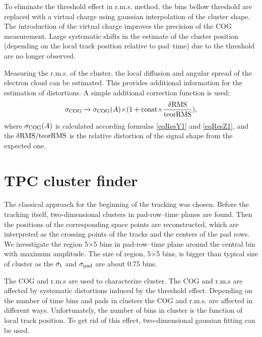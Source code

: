 \documentclass[a4paper,12pt]{article}
\begin{document}
To eliminate the threshold effect in r.m.s. method, the bins
bellow threshold are replaced with a virtual charge  using
gaussian interpolation of the cluster shape. The introduction of
the virtual charge improves the precision of the COG measurement.
Large systematic shifts in the estimate of the cluster position
(depending on the local track position relative to pad--time) due
to the threshold are no longer observed.

Measuring the r.m.s. of the cluster, the local diffusion and
angular spread of the electron cloud can be estimated. This
provides  additional information for the estimation of
distortions. A simple additional correction function is used:
\begin{eqnarray}
     \sigma_{\rm{COG}} \rightarrow
     \sigma_{\rm{COG}}(A){\times}(1+{\rm{const} {\times}\frac{\delta
     \rm{RMS}}{\rm{teorRMS}}}),
\label{eqResUsingRMS}
\end{eqnarray}
where $\sigma_{\rm{COG}}(A)$ is calculated according formulas
\ref{eqResY1} and \ref{eqResZ1}, and the
$\delta\rm{RMS}/\rm{teorRMS}$ is the relative distortion of the
signal shape from the expected one.






\section{TPC cluster finder}

The classical approach for the beginning of the tracking was
chosen. Before the tracking itself, two-dimensional clusters in
pad-row--time planes are found. Then the positions of the
corresponding space points are reconstructed, which are
interpreted as the crossing points of the tracks and the centers
of the pad rows. We investigate the region 5$\times$5 bins in
pad-row--time plane around the central bin with maximum amplitude.
The size of region, 5$\times$5 bins, is bigger than typical size
of cluster as the $\sigma_{\rm{t}}$ and $\sigma_{\rm{pad}}$ are
about 0.75 bins.

The COG and r.m.s are used to characterize cluster. The COG and
r.m.s are affected by systematic distortions induced by the
threshold effect. Depending on the number of time bins and pads in
clusters the COG and r.m.s. are affected in different ways.
Unfortunately, the number of bins in cluster is the function of
local track position. To get rid of this effect, two-dimensional
gaussian fitting can be used.
\end{document}
